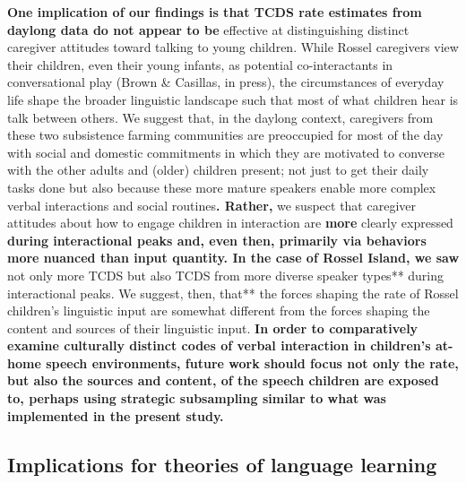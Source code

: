 \documentclass[,man,floatsintext]{apa6}
\begin{document}
\textbf{One implication of our findings is that TCDS rate estimates from
daylong data do not appear to be} effective at distinguishing distinct
caregiver attitudes toward talking to young children. While Rossel
caregivers view their children, even their young infants, as potential
co-interactants in conversational play (Brown \& Casillas, in press),
the circumstances of everyday life shape the broader linguistic
landscape such that most of what children hear is talk between others.
We suggest that, in the daylong context, caregivers from these two
subsistence farming communities are preoccupied for most of the day with
social and domestic commitments in which they are motivated to converse
with the other adults and (older) children present; not just to get
their daily tasks done but also because these more mature speakers
enable more complex verbal interactions and social routines\textbf{.
Rather,} we suspect that caregiver attitudes about how to engage
children in interaction are \textbf{more} clearly expressed
\textbf{during interactional peaks and, even then, primarily via
behaviors more nuanced than input quantity. In the case of Rossel
Island, we saw }not only more TCDS but also TCDS from more diverse
speaker types** during interactional peaks. We suggest, then, that** the
forces shaping the rate of Rossel children's linguistic input are
somewhat different from the forces shaping the content and sources of
their linguistic input. \textbf{In order to comparatively examine
culturally distinct codes of verbal interaction in children's at-home
speech environments, future work should focus not only the rate, but
also the sources and content, of the speech children are exposed to,
perhaps using strategic subsampling similar to what was implemented in
the present study.}

\subsection{\texorpdfstring{\textbf{Implications for theories of
language
learning}}{Implications for theories of language learning}}\label{implications-for-theories-of-language-learning}
\end{document}
